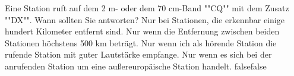     {Eine Station ruft auf dem 2 m- oder dem 70 cm-Band ""CQ"" mit dem Zusatz ""DX"". Wann sollten Sie antworten?}
    {Nur bei Stationen, die erkennbar einige hundert Kilometer entfernt sind.}
    {Nur wenn die Entfernung zwischen beiden Stationen höchstens 500 km beträgt.}
    {Nur wenn ich als hörende Station die rufende Station mit guter Lautstärke empfange.}
    {Nur wenn es sich bei der anrufenden Station um eine außereuropäische Station handelt.}
    {false}{false}